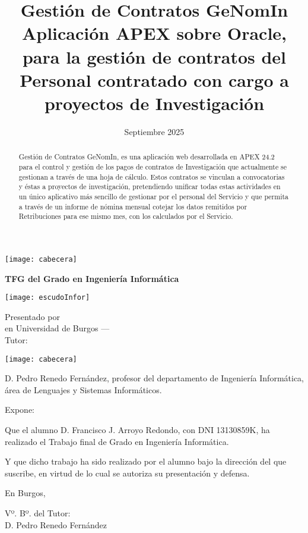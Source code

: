 \documentclass[a4paper,12pt,twoside]{memoir}
\title{\fontsize{18pt}{22pt}\selectfont Gestión de Contratos GeNomIn\\
	\fontsize{16pt}{18pt}\selectfont Aplicación APEX sobre Oracle, para la gestión de contratos del Personal contratado con cargo a proyectos de Investigación}
\author{\nombre}
\date{Septiembre 2025}
\makeatletter
\def\maketitle{
  \null
  \thispagestyle{empty}
\noindent\texttt{[image: cabecera]}\vspace{1cm}%
  \vfill
  
  \colorbox{cpardoBox}{%
    \begin{minipage}{.8\textwidth}
      \vspace{.5cm}\Large
      \begin{center}
      \textbf{TFG del Grado en Ingeniería Informática}\vspace{.6cm}\\
      \textbf{\LARGE\@title{}}
      \end{center}
      \vspace{.2cm}
    \end{minipage}

  }%
  \hfill\begin{minipage}{.20\textwidth}
    \texttt{[image: escudoInfor]}
  \end{minipage}
  \vfill
  
  \begin{center}%
  {%
    \noindent\LARGE
    Presentado por \@author{}\\ 
    en Universidad de Burgos --- \@date{}\\
    Tutor: \@tutor{}\\
  }%
  \end{center}%
  \null
  \cleardoublepage
  }
\newcommand{\nombre}{Francisco J. Arroyo Redondo}
\makeatother
\begin{document}
\maketitle




\thispagestyle{empty}


\noindent\texttt{[image: cabecera]}\vspace{1cm}

\noindent D. Pedro Renedo Fernández, profesor del departamento de Ingeniería Informática, área de Lenguajes y Sistemas Informáticos.

\noindent Expone:

\noindent Que el alumno D. \nombre, con DNI 13130859K, ha realizado el Trabajo final de Grado en Ingeniería Informática. 

\noindent Y que dicho trabajo ha sido realizado por el alumno bajo la dirección del que suscribe, en virtud de lo cual se autoriza su presentación y defensa.

\begin{center} %
En Burgos, 
\end{center}

\vfill\vfill\vfill

\begin{center}
  Vº. Bº. del Tutor:\\[2cm]
  D. Pedro Renedo Fernández
  \end{center}


\newpage\null\thispagestyle{empty}\newpage




\frontmatter

\renewcommand*\abstractname{Resumen}
\begin{abstract}
Gestión de Contratos GeNomIn, es una aplicación web desarrollada en \acrfull{APEX} 24.2 para el control y gestión de los pagos de contratos de  Investigación que actualmente se gestionan a través de una hoja de cálculo. Estos contratos se vinculan a convocatorias y éstas a proyectos de investigación, pretendiendo unificar todas estas actividades en un único aplicativo más sencillo de gestionar por el personal del Servicio y que permita a través de un informe de nómina mensual cotejar los datos remitidos por Retribuciones para ese mismo mes, con los calculados por el Servicio.

\end{abstract}
\end{document}
